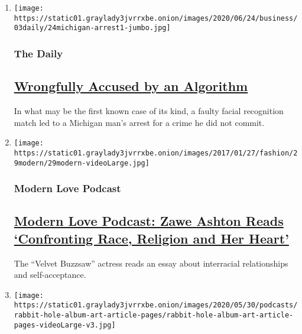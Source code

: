 \begin{enumerate}
\def\labelenumi{\arabic{enumi}.}
\item
  \texttt{[image: https://static01.graylady3jvrrxbe.onion/images/2020/06/24/business/03daily/24michigan-arrest1-jumbo.jpg]}

  \hypertarget{the-daily}{%
  \subsubsection{The Daily}\label{the-daily}}

  \hypertarget{wrongfully-accused-by-an-algorithm}{%
  \subsection{\texorpdfstring{\href{/2020/08/03/podcasts/the-daily/algorithmic-justice-racism.html}{Wrongfully
  Accused by an
  Algorithm}}{Wrongfully Accused by an Algorithm}}\label{wrongfully-accused-by-an-algorithm}}

  In what may be the first known case of its kind, a faulty facial
  recognition match led to a Michigan man's arrest for a crime he did
  not commit.
\item
  \texttt{[image: https://static01.graylady3jvrrxbe.onion/images/2017/01/27/fashion/29modern/29modern-videoLarge.jpg]}

  \hypertarget{modern-love-podcast}{%
  \subsubsection{Modern Love Podcast}\label{modern-love-podcast}}

  \hypertarget{modern-love-podcast-zawe-ashton-reads-confronting-race-religion-and-her-heart}{%
  \subsection{\texorpdfstring{\href{/2020/06/24/style/modern-love-podcast-zawe-ashton.html}{Modern
  Love Podcast: Zawe Ashton Reads `Confronting Race, Religion and Her
  Heart'}}{Modern Love Podcast: Zawe Ashton Reads `Confronting Race, Religion and Her Heart'}}\label{modern-love-podcast-zawe-ashton-reads-confronting-race-religion-and-her-heart}}

  The ``Velvet Buzzsaw'' actress reads an essay about interracial
  relationships and self-acceptance.
\item
  \texttt{[image: https://static01.graylady3jvrrxbe.onion/images/2020/05/30/podcasts/rabbit-hole-album-art-article-pages/rabbit-hole-album-art-article-pages-videoLarge-v3.jpg]}


\end{enumerate}
